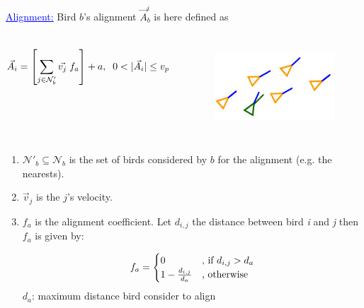 \documentclass{beamer}
\begin{document}
\begin{frame}
\textcolor{blue}{\underline{Alignment:}}
Bird $b$'s alignment \(\vec{A}_b^i\) is here defined as %

\begin{columns}
\begin{align}
  \vec{A}_i = \left[\sum_{j \in \mathcal{N}'_b}{\vec{v_j}}\;f_a\right] + a, \;\;0 < |\vec{A}_i| \leq v_p \notag
  \label{eq:alignment}
\end{align}

\begin{figure}[h!]
		\includegraphics[scale=0.4]{images/alignemtn}
		\label{fig:vFOV}
\end{figure}	


\end{columns}

\begin{enumerate}
\item \(\mathcal{N}'_b \subseteq \mathcal{N}_b\) is the set of birds considered by $b$ for the alignment (e.g. the nearests).
\item \(\vec{v}_j\) is the $j$'s velocity.
\item \(f_a\) is the alignment coefficient. Let \(d_{i,j}\) the distance between bird \emph{i} and \emph{j} then \(f_a\) is given by:

\begin{equation*}
	f_a = \begin{cases}
	0 &\text{, if $ d_{i,j} > d_a$}\\
	1- \frac{d_{i,j}}{d_a} &\text{, otherwise} \notag
	\end{cases}
\end{equation*}
$d_a$: maximum distance bird consider to align 
\end{enumerate}
\end{frame}
\end{document}
